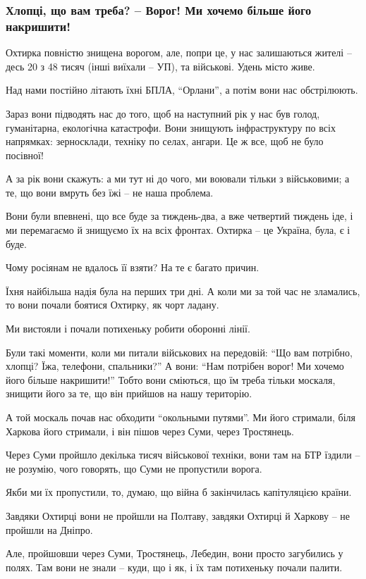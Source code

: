  
 
 
 
 

\subsubsection{Хлопці, що вам треба? – Ворог! Ми хочемо більше його накришити!}
\label{sec:30_03_2022.stz.news.ua.pravda.2.ohtyrka.4.vorog}

Охтирка повністю знищена ворогом, але, попри це, у нас залишаються жителі –
десь 20 з 48 тисяч (інші виїхали – УП), та військові. Удень місто живе.

Над нами постійно літають їхні БПЛА, \enquote{Орлани}, а потім вони нас
обстрілюють. 

Зараз вони підводять нас до того, щоб на наступний рік у нас був голод,
гуманітарна, екологічна катастрофи. Вони знищують інфраструктуру по всіх
напрямках: зерносклади, техніку по селах, ангари. Це ж все, щоб не було
посівної!

А за рік вони скажуть: а ми тут ні до чого, ми воювали тільки з військовими; а
те, що вони вмруть без їжі – не наша проблема. 

Вони були впевнені, що все буде за тиждень-два, а вже четвертий тиждень іде, і
ми перемагаємо й знищуємо їх на всіх фронтах. Охтирка – це Україна, була, є і
буде.


Чому росіянам не вдалось її взяти? На те є багато причин.

Їхня найбільша надія була на перших три дні. А коли ми за той час не зламались,
то вони почали боятися Охтирку, як чорт ладану. 

Ми вистояли і почали потихеньку робити оборонні лінії. 

Були такі моменти, коли ми питали військових на передовій: \enquote{Що вам
потрібно, хлопці? Їжа, телефони, спальники?} А вони: \enquote{Нам потрібен
ворог! Ми хочемо його більше накришити!} Тобто вони сміються, що їм треба
тільки москаля, знищити його за те, що він прийшов на нашу територію. 

А той москаль почав нас обходити \enquote{окольными путями}. Ми його стримали,
біля Харкова його стримали, і він пішов через Суми, через Тростянець. 

Через Суми пройшло декілька тисяч військової техніки, вони там на БТР їздили –
не розумію, чого говорять, що Суми не пропустили ворога.

Якби ми їх пропустили, то, думаю, що війна б закінчилась капітуляцією країни. 

Завдяки Охтирці вони не пройшли на Полтаву, завдяки Охтирці й Харкову – не
пройшли на Дніпро.

Але, пройшовши через Суми, Тростянець, Лебедин, вони просто загубились у полях.
Там вони не знали – куди, що і як, і їх там потихеньку почали палити.
